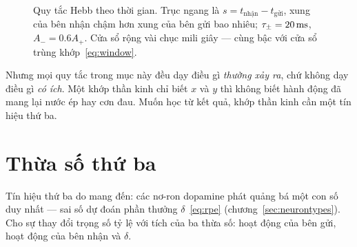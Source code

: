 \begin{figure}[t]
\centering
{}
\caption{Quy tắc Hebb theo thời gian. Trục ngang là $s=t_{\text{nhận}}-t_{\text{gửi}}$, xung của bên nhận chậm hơn xung của bên gửi bao nhiêu; $\tau_\pm=20\,\text{ms}$, $A_-=0.6A_+$. Cửa sổ rộng vài chục mili giây --- cùng bậc với cửa sổ trùng khớp~\eqref{eq:window}.}
\label{fig:stdp}
\end{figure}

Nhưng mọi quy tắc trong mục này đều dạy điều gì \emph{thường xảy ra}, chứ không dạy điều gì \emph{có ích}. Một khớp thần kinh chỉ biết $x$ và $y$ thì không biết hành động đã mang lại nước ép hay cơn đau. Muốn học từ kết quả, khớp thần kinh cần một tín hiệu thứ ba.

\section{Thừa số thứ ba}

Tín hiệu thứ ba do  mang đến: các nơ-ron dopamine phát quảng bá một con số duy nhất --- sai số dự đoán phần thưởng $\delta$~\eqref{eq:rpe} (chương~\ref{sec:neurontypes}). Cho sự thay đổi trọng số tỷ lệ với tích của ba thừa số: hoạt động của bên gửi, hoạt động của bên nhận và $\delta$.


